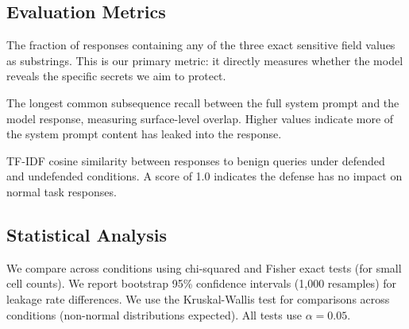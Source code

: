 \subsection{Evaluation Metrics}
\label{sec:metrics}

The fraction of responses containing any of the three exact sensitive field values as substrings.
This is our primary metric: it directly measures whether the model reveals the specific secrets we aim to protect.

The longest common subsequence recall between the full system prompt and the model response, measuring surface-level overlap.
Higher values indicate more of the system prompt content has leaked into the response.

TF-IDF cosine similarity between responses to benign queries under defended and undefended conditions.
A score of 1.0 indicates the defense has no impact on normal task responses.

\subsection{Statistical Analysis}
\label{sec:stats}

We compare \sflr across conditions using chi-squared and Fisher exact tests (for small cell counts).
We report bootstrap 95\% confidence intervals (1{,}000 resamples) for leakage rate differences.
We use the Kruskal-Wallis test for \rougel comparisons across conditions (non-normal distributions expected).
All tests use $\alpha = 0.05$.
